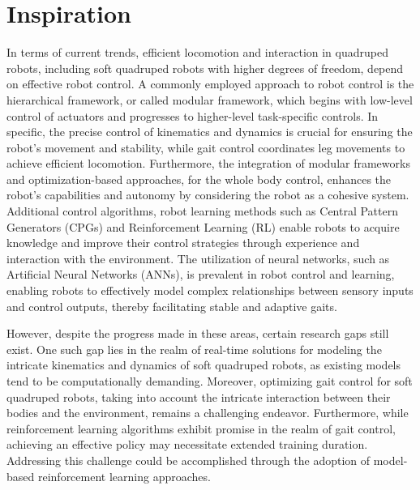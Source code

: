 \section{Inspiration}
In terms of current trends, efficient locomotion and interaction in quadruped robots, including soft quadruped robots with higher degrees of freedom, depend on effective robot control. A commonly employed approach to robot control is the hierarchical framework, or called modular framework, which begins with low-level control of actuators and progresses to higher-level task-specific controls. In specific, the precise control of kinematics and dynamics is crucial for ensuring the robot's movement and stability, while gait control coordinates leg movements to achieve efficient locomotion. Furthermore, the integration of modular frameworks and optimization-based approaches, for the whole body control, enhances the robot's capabilities and autonomy by considering the robot as a cohesive system. Additional control algorithms, robot learning methods such as Central Pattern Generators (CPGs) and Reinforcement Learning (RL) enable robots to acquire knowledge and improve their control strategies through experience and interaction with the environment. The utilization of neural networks, such as Artificial Neural Networks (ANNs), is prevalent in robot control and learning, enabling robots to effectively model complex relationships between sensory inputs and control outputs, thereby facilitating stable and adaptive gaits.

However, despite the progress made in these areas, certain research gaps still exist. One such gap lies in the realm of real-time solutions for modeling the intricate kinematics and dynamics of soft quadruped robots, as existing models tend to be computationally demanding. Moreover, optimizing gait control for soft quadruped robots, taking into account the intricate interaction between their bodies and the environment, remains a challenging endeavor. Furthermore, while reinforcement learning algorithms exhibit promise in the realm of gait control, achieving an effective policy may necessitate extended training duration. Addressing this challenge could be accomplished through the adoption of model-based reinforcement learning approaches.

